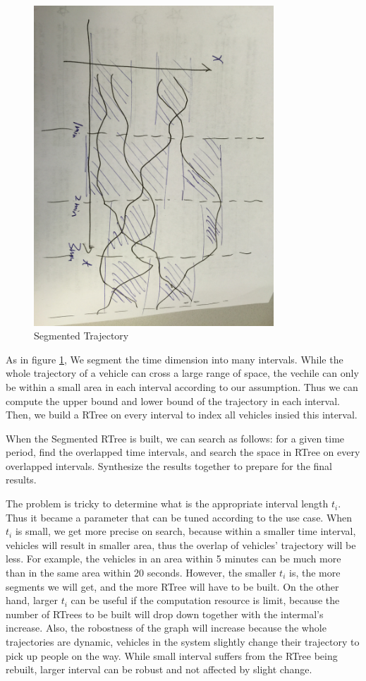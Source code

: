 \documentclass{vldb}
\begin{document}
\begin{figure}[ht!]
  \centering
  \includegraphics[width=90mm]{seg.jpg}
  \caption{Segmented Trajectory \label{segment_fig}}
\end{figure}

As in figure \ref{segment_fig}, We segment the time dimension into many intervals.
While the whole trajectory of a vehicle can cross a large range of space,
the vechile can only be within a small area in each interval according to our assumption.
Thus we can compute the upper bound and lower bound of the trajectory in each interval.
Then, we build a RTree on every interval to index all vehicles insied this interval.


When the Segmented RTree is built, we can search as follows:
for a given time period, find the overlapped time intervals,
and search the space in RTree on every overlapped intervals.
Synthesize the results together to prepare for the final results.

The problem is tricky to determine what is the appropriate interval length $t_i$.
Thus it became a parameter that can be tuned according to the use case.
When $t_i$ is small, we get more precise on search, because within a smaller time interval,
vehicles will result in smaller area, thus the overlap of vehicles' trajectory will be less.
For example, the vehicles in an area within 5 minutes can be much more than in the same area within 20 seconds.
However, the smaller $t_i$ is, the more segments we will get, and the more RTree will have to be built.
On the other hand, larger $t_i$ can be useful if the computation resource is limit,
because the number of RTrees to be built will drop down together with the intermal's increase.
Also, the robostness of the graph will increase because the whole trajectories are dynamic,
vehicles in the system slightly change their trajectory to pick up people on the way.
While small interval suffers from the RTree being rebuilt,
larger interval can be robust and not affected by slight change.
\end{document}
